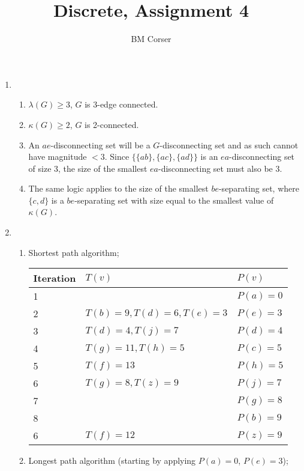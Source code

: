 \documentclass[10pt]{article}
\author{BM Corser}
\title{Discrete, Assignment 4}
\begin{document}
    \maketitle 
    \begin{enumerate}
        \item 
        \begin{enumerate}
            \item $\lambda(G) \geq 3$, $G$ is 3-edge connected.
            \item $\kappa(G) \geq 2$, $G$ is 2-connected.
            \item An $ae$-disconnecting set will be a $G$-disconnecting set and
                as such cannot have magnitude $<3$. Since $\{\{ab\},
                \{ac\}, \{ad\}\}$ is an $ea$-disconnecting set of size 3, the
                size of the smallest $ea$-disconnecting set must also be 3.
            \item The same logic applies to the size of the smallest
                $be$-separating set, where $\{c, d\}$ is a $be$-separating set
                with size equal to the smallest value of $\kappa(G)$.
        \end{enumerate}
        \item 
        \begin{enumerate}
            \item Shortest path algorithm;

				\begin{tabular}{ l | l | l }
                    Iteration & $T(v)$ & $P(v)$ \\
                    \hline
                    1 & & $P(a) = 0$ \\
                    2 & $T(b) = 9, T(d) = 6, T(e) = 3$ & $P(e) = 3$ \\
                    3 & $T(d) = 4, T(j) = 7$ & $P(d) = 4$ \\
                    4 & $T(g) = 11, T(h) = 5$ & $P(c) = 5$ \\
                    5 & $T(f) = 13$ & $P(h) = 5$ \\
                    6 & $T(g) = 8, T(z) = 9$ & $P(j) = 7$ \\
                    7 & & $P(g) = 8$ \\
                    8 & & $P(b) = 9$ \\
                    6 & $T(f) = 12$ & $P(z) = 9$ \\
				\end{tabular}
            \item Longest path algorithm (starting by applying $P(a) = 0$,
                $P(e) = 3$);


\end{enumerate}
\end{enumerate}
\end{document}
